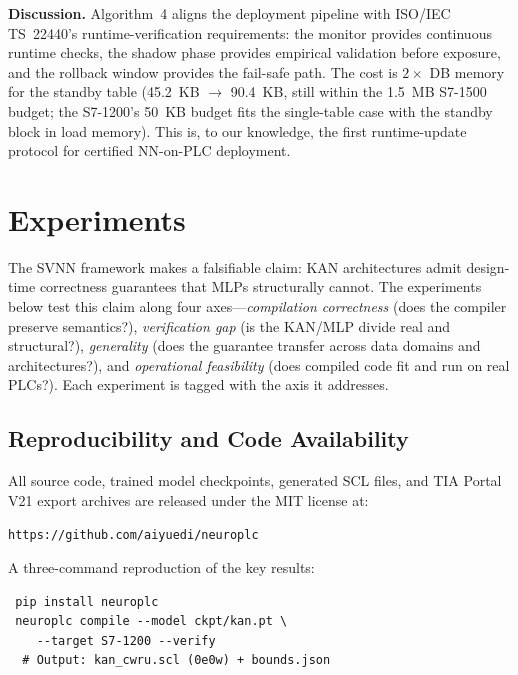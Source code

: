 \documentclass[journal,onecolumn]{IEEEtran}
\begin{document}
\vspace{2pt}
\noindent\textbf{Discussion.} Algorithm~4 aligns the deployment pipeline
with ISO/IEC TS~22440's runtime-verification requirements: the monitor
provides continuous runtime checks, the shadow phase provides empirical
validation before exposure, and the rollback window provides the
fail-safe path. The cost is $2\times$ DB memory for the standby table
(45.2~KB $\to$ 90.4~KB, still within the 1.5~MB S7-1500 budget; the
S7-1200's 50~KB budget fits the single-table case with the standby
block in load memory). This is, to our knowledge, the first runtime-update protocol for
certified NN-on-PLC deployment.





\section{Experiments}
\label{sec:experiments}

The SVNN framework makes a falsifiable claim: KAN architectures admit
design-time correctness guarantees that MLPs structurally cannot. The
experiments below test this claim along four axes---\textit{compilation
correctness} (does the compiler preserve semantics?), \textit{verification
gap} (is the KAN/MLP divide real and structural?), \textit{generality}
(does the guarantee transfer across data domains and architectures?), and
\textit{operational feasibility} (does compiled code fit and run on real
PLCs?). Each experiment is tagged with the axis it addresses.

\subsection{Reproducibility and Code Availability}
\label{sec:reproducibility}

All source code, trained model checkpoints, generated SCL files, and TIA
Portal V21 export archives are released under the MIT license at:
\begin{center}
\texttt{https://github.com/aiyuedi/neuroplc}
\end{center}

A three-command reproduction of the key results:
\begin{verbatim}
 pip install neuroplc
 neuroplc compile --model ckpt/kan.pt \
    --target S7-1200 --verify
  # Output: kan_cwru.scl (0e0w) + bounds.json
\end{verbatim}
\end{document}
